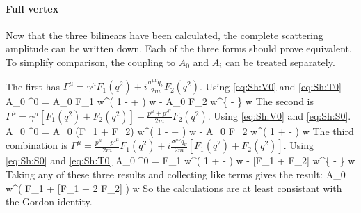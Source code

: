 \paragraph{Full vertex}

Now that the three bilinears have been calculated, the complete scattering amplitude can be written down.  Each of the three forms should prove equivalent.  To simplify comparison, the coupling to $A_0$ and $A_i$ can be treated separately.

The first has $	\Gamma^\mu = \gamma^\mu F_1(q^2) + i \frac{\sigma^{\mu\nu}q_\nu}{2m} F_2 (q^2)$.  Using \eqref{eq:Sh:V0} and \eqref{eq:Sh:T0}
\beq
	A_0 \srb  \Gamma^0 \sr = 
		A_0 F_1   w^\dagger \left( 
		1 -   +  
		\right ) w
		- A_0 F_2 w^\dagger \left \{
			-  
	\right \} w
\eeq
The second is	$\Gamma^\mu = \gamma^\mu [F_1(q^2) + F_2(q^2) ]  -  \frac{p^\mu  + p'^\mu }{2m}F_2 (q^2)$.  Using \eqref{eq:Sh:V0} and \eqref{eq:Sh:S0}.
\beq
	A_0 \srb  \Gamma^0 \sr = 
		A_0 (F_1 + F_2)   w^\dagger \left( 
		1 -   +  
		\right ) w
		- A_0 F_2   w^\dagger \left( 
		1 +   -  
		\right ) w
\eeq
The third combination is $	\Gamma^\mu = \frac{p^\mu  + p'^\mu }{2m} F_1(q^2) + i \frac{\sigma^{\mu\nu}q_\nu}{2m} [F_1(q^2) + F_2(q^2) ] $.  Using \eqref{eq:Sh:S0} and \eqref{eq:Sh:T0}
\beq
	 A_0 \srb  \Gamma^0 \sr = 
		F_1 w^\dagger \left( 
		1 +   -  
		\right ) w
		- [F_1 + F_2]  w^\dagger \left \{
			-  
	\right \} w
\eeq
Taking any of these three results and collecting like terms gives the result:
\beq
		A_0  w^\dagger \left(  
			F_1 
			+ [F_1 + 2 F_2] 
		\right ) w
\eeq
So the calculations are at least consistant with the Gordon identity.

